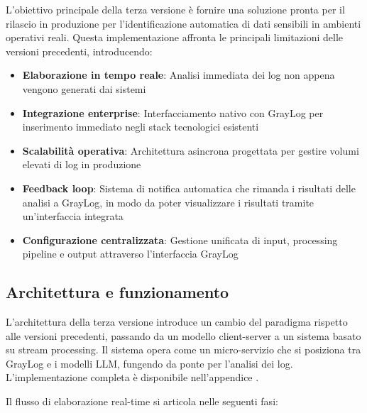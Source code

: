 \documentclass[12pt]{report}
\begin{document}
L'obiettivo principale della terza versione è fornire una soluzione pronta per il rilascio in produzione per l'identificazione automatica di dati sensibili in ambienti operativi reali. Questa implementazione affronta le principali limitazioni delle versioni precedenti, introducendo:

\begin{itemize}
    \item \textbf{Elaborazione in tempo reale}: Analisi immediata dei log non appena vengono generati dai sistemi
    \item \textbf{Integrazione enterprise}: Interfacciamento nativo con GrayLog per inserimento immediato negli stack tecnologici esistenti
    \item \textbf{Scalabilità operativa}: Architettura asincrona progettata per gestire volumi elevati di log in produzione
    \item \textbf{Feedback loop}: Sistema di notifica automatica che rimanda i risultati delle analisi a GrayLog, in modo da poter visualizzare i risultati tramite un'interfaccia integrata
    \item \textbf{Configurazione centralizzata}: Gestione unificata di input, processing pipeline e output attraverso l'interfaccia GrayLog
\end{itemize}

\subsection{Architettura e funzionamento}
\label{subsec:ver3_architettura}

L'architettura della terza versione introduce un cambio del paradigma rispetto alle versioni precedenti, passando da un modello client-server a un sistema basato su stream processing. Il sistema opera come un micro-servizio che si posiziona tra GrayLog e i modelli LLM, fungendo da ponte per l'analisi dei log. \\
L'implementazione completa è disponibile nell'appendice .

Il flusso di elaborazione real-time si articola nelle seguenti fasi:
\end{document}
